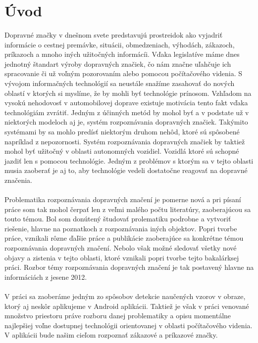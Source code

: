 \documentclass[12pt]{article}
\begin{document}
\section*{Úvod}
\paragraph{}
Dopravné značky v dnešnom svete predstavujú prostreidok ako vyjadriť informácie o cestnej premávke, situácii, obmedzeniach, výhodách, zákazoch, príkazoch a mnoho iných užitočných informácíi. Vďaka legislatíve máme dnes jednotný štandart výroby dopravných značiek, čo nám značne uľahčuje ich spracovanie či už voľným pozorovaním alebo pomocou počítačového videnia. S vývojom informačných technológií sa neustále snažíme zasahovať do nových oblastí v ktorých si myslíme, že by mohli byť technológie prínosom. Vzhľadom na vysokú nehodovosť v automobilovej doprave existuje motivácia  tento fakt vďaka technológiám zvrátiť. Jedným z účinných metód by mohol byť a v podstate už v niektorých modeloch aj je, systém rozpoznávania dopravných značiek. Takýmito systémami by sa mohlo predísť niektorým druhom nehôd, ktoré sú spôsobené napríklad z nepozornosti. Systém rozpoznávania dopravných značiek by taktiež mohol byť užitočný v oblasti autonomných vozidiel. Vozidlá ktoré sú schopné jazdiť len s pomocou technológie. Jedným z problémov s ktorým sa v tejto oblasti musia zaoberať je aj to, aby technológie vedeli dostatočne reagovať na dopravné značenia.
\paragraph{}
Problematika rozpoznávania dopravných značení je pomerne nová a pri písaní práce som tak mohol čerpať len z veľmi malého počtu literatúry, zaoberajúcou sa touto témou.
Bol som donútený študovať prolematiku podrobne a vytvoriť riešenie, hlavne na poznatkoch z rozpoznávania iných objektov.
Popri tvorbe práce, vznikali rôzne ďaľšie práce a publikácie zaoberajúce sa konkrétne témou rozpoznávania dopravných značení.
Nebolo však možné sledovať všetky nové objavy a zistenia v tejto oblasti, ktoré vznikali popri tvorbe tejto bakalárksej práci.
Rozbor témy rozpoznávania dopravných značení je tak postavený hlavne na informáciách z jesene 2012.
\paragraph{}
V práci sa zaoberáme jedným zo spôsobov detekcie naučených vzorov v obraze, ktorý aj neskôr aplikujeme v Android aplikácii. Taktiež je však v práci venované množstvo priestoru práve rozboru danej problematiky a opisu momentálne najlepšiej voľne dostupnej technológii orientovanej v oblasti počítačového videnia. V aplikácii bude našim cieľom rozpoznať zákazové a príkazové značky.
\clearpage
\end{document}
